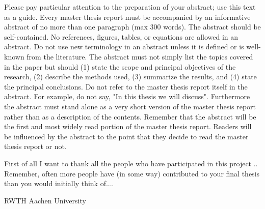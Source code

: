 \documentclass[a4paper,11pt]{MScThesis}
\begin{document}
%
\frontmatter %
%
    \maketitle
%

Please pay particular attention to the preparation of your abstract; use this text as a guide. Every master thesis report must be accompanied by an informative abstract of no more than one paragraph (max 300 words). The abstract should be self-contained. No references, figures, tables, or equations are allowed in an abstract. Do not use new terminology in an abstract unless it is defined or is well-known from the literature. The abstract must not simply list the topics covered in the paper but should (1) state the scope and principal objectives of the research, (2) describe the methods used, (3) summarize the results, and (4) state the principal conclusions. Do not refer to the master thesis report itself in the abstract. For example, do not say, "In this thesis we will discuss". Furthermore the abstract must stand alone as a very short version of the master thesis report rather than as a description of the contents. Remember that the abstract will be the first and most widely read portion of the master thesis report. Readers will be influenced by the abstract to the point that they decide to read the master thesis report or not.

    \cleardoublepage
%
    First of all I want to thank all the people who have participated in this project ..
    Remember, often more people have (in some way) contributed to your final thesis than you would initially think of....
    \vspace*{15mm}

    \noindent 
    RWTH Aachen University \hfill \mscname\\ %
    \mscdate

%
    \tocloflot
%
    \printnomencl %
%
    \begin{acronym}%
    \end{acronym}%
    \cleardoublepage%
%
%
%
\mainmatter
%
\end{document}

